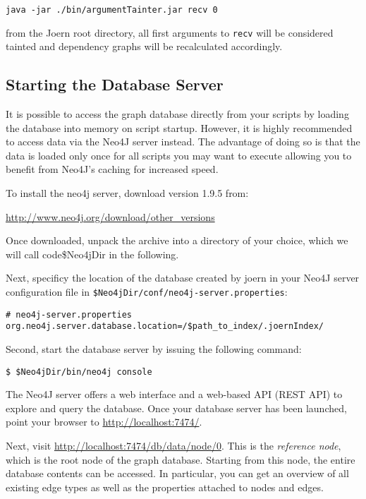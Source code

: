 \documentclass[a4paper]{article}
\newcommand{\code}[1]{\texttt{\small #1}}
\begin{document}
\begin{verbatim}
java -jar ./bin/argumentTainter.jar recv 0
\end{verbatim}

from the Joern root directory, all first arguments to \code{recv} will
be considered tainted and dependency graphs will be recalculated
accordingly.

\subsection{Starting the Database Server}

It is possible to access the graph database directly from your scripts
by loading the database into memory on script startup. However, it is
highly recommended to access data via the Neo4J server instead. The
advantage of doing so is that the data is loaded only once for all
scripts you may want to execute allowing you to benefit from Neo4J's
caching for increased speed.

To install the neo4j server, download version 1.9.5 from:

\href{http://www.neo4j.org/download/other\_versions}{http://www.neo4j.org/download/other\_versions}

Once downloaded, unpack the archive into a directory of your choice,
which we will call code{\$Neo4jDir} in the following.

Next, specificy the location of the database created by joern in your
Neo4J server configuration file in
\code{\$Neo4jDir/conf/neo4j-server.properties}:

\begin{verbatim}
# neo4j-server.properties
org.neo4j.server.database.location=/$path_to_index/.joernIndex/
\end{verbatim}

Second, start the database server by issuing the following command:

\begin{verbatim}
$ $Neo4jDir/bin/neo4j console
\end{verbatim}
	
The Neo4J server offers a web interface and a web-based API (REST API)
to explore and query the database. Once your database server has been
launched, point your browser to
\href{http://localhost:7474/}{http://localhost:7474/}. 

Next, visit
\href{http://localhost:7474/db/data/node/0}{http://localhost:7474/db/data/node/0}. This
is the \emph{reference node}, which is the root node of the graph
database. Starting from this node, the entire database contents can be
accessed. In particular, you can get an overview of all existing edge
types as well as the properties attached to nodes and edges.
\end{document}
